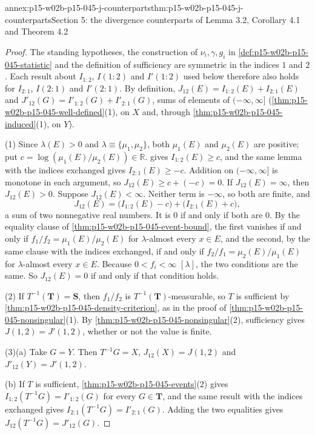 \begin{annexitem}{annex:p15-w02b-p15-045-j-counterparts}{thm:p15-w02b-p15-045-j-counterparts}{Section 5: the divergence counterparts of Lemma 3.2, Corollary 4.1 and Theorem 4.2}
\begin{proof}
The standing hypotheses, the construction of \(\nu_i,\gamma,g_i\) in
\cref{def:p15-w02b-p15-045-statistic} and the definition of sufficiency
are symmetric in the indices \(1\) and \(2\). Each result about
\(I_{1:2}\), \(I(1:2)\) and \(I'(1:2)\) used below therefore also holds
for \(I_{2:1}\), \(I(2:1)\) and \(I'(2:1)\). By definition,
\(J_{12}(E)=I_{1:2}(E)+I_{2:1}(E)\) and
\(J'_{12}(G)=I'_{1:2}(G)+I'_{2:1}(G)\), sums of elements of
\((-\infty,\infty]\) (\cref{thm:p15-w02b-p15-045-well-defined}(1), on
\(X\) and, through \cref{thm:p15-w02b-p15-045-induced}(1), on \(Y\)).

(1) Since \(\lambda(E)>0\) and \(\lambda\equiv\{\mu_1,\mu_2\}\), both
\(\mu_1(E)\) and \(\mu_2(E)\) are positive; put
\(c=\log(\mu_1(E)/\mu_2(E))\in\mathbb R\).
 gives \(I_{1:2}(E)\geq c\), and
the same lemma with the indices exchanged gives \(I_{2:1}(E)\geq-c\).
Addition on \((-\infty,\infty]\) is monotone in each argument, so
\(J_{12}(E)\geq c+(-c)=0\). If \(J_{12}(E)=\infty\), then
\(J_{12}(E)>0\). Suppose \(J_{12}(E)<\infty\). Neither term is
\(-\infty\), so both are finite, and
\[
  J_{12}(E)=\bigl(I_{1:2}(E)-c\bigr)+\bigl(I_{2:1}(E)+c\bigr),
\]
a sum of two nonnegative real numbers. It is \(0\) if and only if both
are \(0\). By the equality clause of
\cref{thm:p15-w02b-p15-045-event-bound}, the first vanishes if and only
if \(f_1/f_2=\mu_1(E)/\mu_2(E)\) for \(\lambda\)-almost every \(x\in E\),
and the second, by the same clause with the indices exchanged, if and
only if \(f_2/f_1=\mu_2(E)/\mu_1(E)\) for \(\lambda\)-almost every
\(x\in E\). Because \(0<f_i<\infty\) \([\lambda]\), the two conditions
are the same. So \(J_{12}(E)=0\) if and only if that condition holds.

(2) If \(T^{-1}(\mathbf T)=\mathbf S\), then \(f_1/f_2\) is
\(T^{-1}(\mathbf T)\)-measurable, so \(T\) is sufficient by
\cref{thm:p15-w02b-p15-045-density-criterion}, as in the proof of
\cref{thm:p15-w02b-p15-045-nonsingular}(1). By
\cref{thm:p15-w02b-p15-045-nonsingular}(2), sufficiency gives
\(J(1,2)=J'(1,2)\), whether or not the value is finite.

(3)(a) Take \(G=Y\). Then \(T^{-1}G=X\), \(J_{12}(X)=J(1,2)\) and
\(J'_{12}(Y)=J'(1,2)\).

(b) If \(T\) is sufficient, \cref{thm:p15-w02b-p15-045-events}(2) gives
\(I_{1:2}(T^{-1}G)=I'_{1:2}(G)\) for every \(G\in\mathbf T\), and the
same result with the indices exchanged gives
\(I_{2:1}(T^{-1}G)=I'_{2:1}(G)\). Adding the two equalities gives
\(J_{12}(T^{-1}G)=J'_{12}(G)\).


\end{proof}
\end{annexitem}
